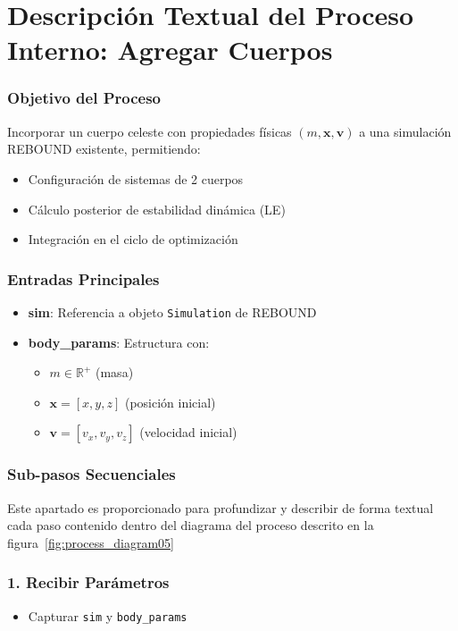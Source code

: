 \section*{Descripción Textual del Proceso Interno: Agregar Cuerpos}

\subsubsection{Objetivo del Proceso}
Incorporar un cuerpo celeste con propiedades físicas $(m, \mathbf{x}, \mathbf{v})$ a una simulación REBOUND existente, permitiendo:
\begin{itemize}
    \item Configuración de sistemas de 2 cuerpos
    \item Cálculo posterior de estabilidad dinámica (LE)
    \item Integración en el ciclo de optimización
\end{itemize}

\subsubsection{Entradas Principales}
\begin{itemize}
    \item \textbf{sim}: Referencia a objeto \texttt{Simulation} de REBOUND
    \item \textbf{body\_params}: Estructura con:
    \begin{itemize}
        \item $m \in \mathbb{R}^+$ (masa)
        \item $\mathbf{x} = [x, y, z]$ (posición inicial)
        \item $\mathbf{v} = [v_x, v_y, v_z]$ (velocidad inicial)
    \end{itemize}
\end{itemize}

\subsubsection{Sub-pasos Secuenciales}
Este apartado es proporcionado para profundizar y describir de forma textual cada paso contenido dentro del diagrama del proceso descrito en la figura~\ref{fig:process_diagram05}
\subsubsection*{1. Recibir Parámetros}
\begin{itemize}
    \item Capturar \texttt{sim} y \texttt{body\_params}
\end{itemize}

